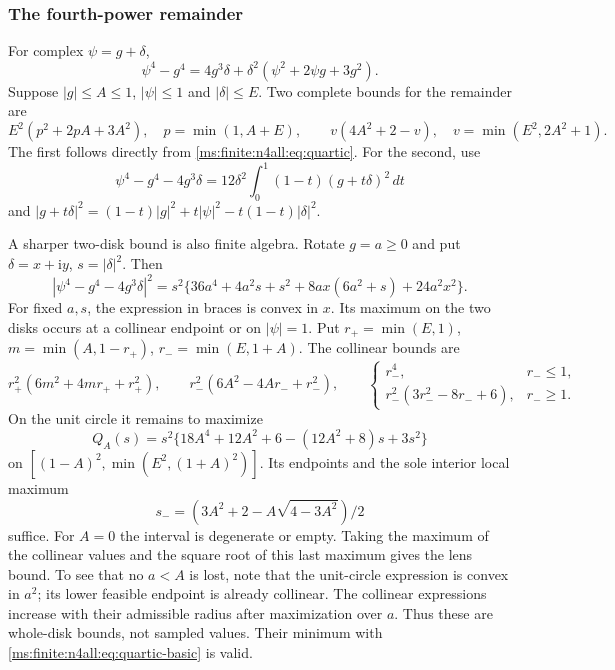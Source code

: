 \subsubsection{The fourth-power remainder}
For complex $\psi=g+\delta$,
\begin{equation}\label{ms:finite:n4all:eq:quartic}
 \psi^4-g^4=4g^3\delta+
 \delta^2(\psi^2+2\psi g+3g^2).
\end{equation}
Suppose $|g|\le A\le1$, $|\psi|\le1$ and $|\delta|\le E$.
Two complete bounds for the remainder are
\begin{equation}\label{ms:finite:n4all:eq:quartic-basic}
 E^2(p^2+2pA+3A^2),\quad p=\min(1,A+E),\qquad
 v(4A^2+2-v),\quad v=\min(E^2,2A^2+1).
\end{equation}
The first follows directly from \eqref{ms:finite:n4all:eq:quartic}. For the
second, use
\[
 \psi^4-g^4-4g^3\delta
   =12\delta^2\int_0^1(1-t)(g+t\delta)^2\,dt
\]
and
$|g+t\delta|^2=(1-t)|g|^2+t|\psi|^2-t(1-t)|\delta|^2$.

A sharper two-disk bound is also finite algebra. Rotate $g=a\ge0$
and put $\delta=x+\mathrm i y$, $s=|\delta|^2$. Then
\[
 |\psi^4-g^4-4g^3\delta|^2
 =s^2\{36a^4+4a^2s+s^2+8ax(6a^2+s)+24a^2x^2\}.
\]
For fixed $a,s$, the expression in braces is convex in $x$.
Its maximum on the two disks occurs at a collinear endpoint or on
$|\psi|=1$. Put $r_+=\min(E,1)$, $m=\min(A,1-r_+)$,
$r_-=\min(E,1+A)$. The collinear bounds are
\[
 r_+^2(6m^2+4mr_++r_+^2),\qquad
 r_-^2(6A^2-4Ar_-+r_-^2),\qquad
 \begin{cases}r_-^4,&r_-\le1,\\
 r_-^2(3r_-^2-8r_-+6),&r_-\ge1.
 \end{cases}
\]
On the unit circle it remains to maximize
\begin{equation}\label{ms:finite:n4all:eq:lens-polynomial}
 Q_A(s)=s^2\{18A^4+12A^2+6-(12A^2+8)s+3s^2\}
\end{equation}
on $[(1-A)^2,\min(E^2,(1+A)^2)]$. Its endpoints and the sole
interior local maximum
\[
 s_-=(3A^2+2-A\sqrt{4-3A^2})/2
\]
suffice. For $A=0$ the interval is degenerate or empty.
Taking the maximum of the collinear values and the square root of
this last maximum gives the lens bound. To see that no $a<A$ is
lost, note that the unit-circle expression is convex in $a^2$;
its lower feasible endpoint is already collinear. The collinear
expressions increase with their admissible radius after maximization
over $a$. Thus these are whole-disk bounds, not sampled values.
Their minimum with \eqref{ms:finite:n4all:eq:quartic-basic} is valid.

